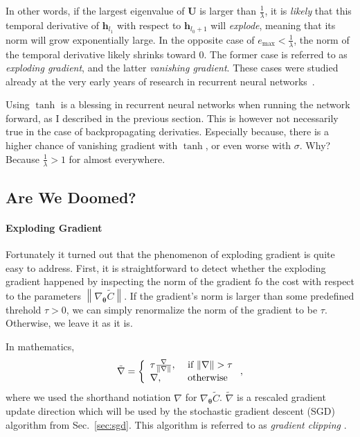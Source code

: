 \documentclass{report}
\newcommand{\vect}[1]{\mathbf{#1}}
\newcommand{\vects}[1]{\boldsymbol{#1}}
\newcommand{\matr}[1]{\mathbf{#1}}
\newcommand{\vh}[0]{\vect{h}}
\newcommand{\mU}[0]{\matr{U}}
\newcommand{\TT}[0]{\vects{\theta}}
\newcommand{\sigmoid}{\sigma}
\begin{document}
In other words, if the largest eigenvalue of $\mU$ is larger than
$\frac{1}{\lambda}$, it is {\em likely} that this temporal derivative of
$\vh_{l_1}$ with respect to $\vh_{l_0+1}$ will {\em explode}, meaning that its
norm will grow exponentially large. In the opposite case of $e_{\max} <
\frac{1}{\lambda}$, the norm of the temporal derivative likely shrinks toward
$0$. The former case is referred to as {\em exploding gradient}, and the latter
{\em vanishing gradient}. These cases were studied already at the very early
years of research in recurrent neural
networks~\cite{bengio1994learning,hochreiter2001gradient}.

Using $\tanh$ is a blessing in recurrent neural networks when running the
network forward, as I described in the previous section. This is however not
necessarily true in the case of backpropagating derivaties. Especially because, 
there is a higher chance of vanishing gradient with $\tanh$, or even worse with
$\sigmoid$. Why? Because $\frac{1}{\lambda} > 1$ for almost everywhere.

\subsection{Are We Doomed?}
\label{sec:rnn_vanish_grad}

\paragraph{Exploding Gradient}

Fortunately it turned out that the phenomenon of exploding gradient is quite
easy to address. First, it is straightforward to detect whether the exploding
gradient happened by inspecting the norm of the gradient fo the cost with
respect to the parameters $\left\| \nabla_{\TT} \tilde{C} \right\|$. If the
gradient's norm is larger than some predefined threhold $\tau > 0$, we can
simply renormalize the norm of the gradient to be $\tau$. Otherwise, we leave it
as it is.

In mathematics,
\begin{align*}
    \tilde{\nabla} = 
    \left\{
        \begin{array}{l l}
            \tau \frac{\nabla}{\|\nabla\|}, & \text{ if } \|\nabla\| > \tau \\
            \nabla, & \text{ otherwise}
        \end{array}
    \right.,
\end{align*}
where we used the shorthand notiation $\nabla$ for $\nabla_{\TT} \tilde{C}$.
$\tilde{\nabla}$ is a rescaled gradient update direction which will be used by
the stochastic gradient descent (SGD) algorithm from Sec.~\ref{sec:sgd}. This
algorithm is referred to as {\em gradient clipping}
\cite{pascanu2013difficulty}.
\end{document}
